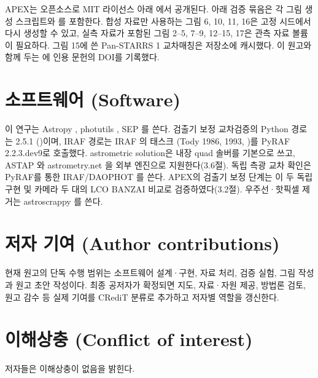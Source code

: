 APEX는 오픈소스로 MIT 라이선스 아래 \texttt{}에서 공개된다. \texttt{} 아래 검증 묶음은 각 그림 생성 스크립트와 \texttt{}를 포함한다. 합성 자료만 사용하는 그림 6, 10, 11, 16은 고정 시드에서 다시 생성할 수 있고, 실측 자료가 포함된 그림 2–5, 7–9, 12–15, 17은 관측 자료 볼륨이 필요하다. 그림 15에 쓴 Pan-STARRS 1 교차매칭은 저장소에 캐시했다. 이 원고와 함께 두는 \texttt{}에 인용 문헌의 DOI를 기록했다.



\section{소프트웨어 (Software)}

이 연구는 Astropy \citep{astropy2013, astropy2018, astropy2022}, photutils \citep{photutils}, SEP \citep{barbary2016} 를 쓴다. 검출기 보정 교차검증의 Python 경로는 \texttt{} 2.5.1 (\citet{ccdproc})이며, IRAF 경로는 IRAF \texttt{}의 \texttt{} 태스크 (Tody 1986, 1993, \citep{tody1986,tody1993})를 PyRAF 2.2.3.dev9로 호출했다. astrometric solution은 내장 quad 솔버를 기본으로 쓰고, ASTAP \citep{astap} 와 astrometry.net \citep{lang2010} 을 외부 엔진으로 지원한다(3.6절). 독립 측광 교차 확인은 PyRAF를 통한 IRAF/DAOPHOT \citep{stetson1987} 를 쓴다. APEX의 검출기 보정 단계는 이 두 독립 구현 및 카메라 두 대의 LCO BANZAI 비교로 검증하였다(3.2절). 우주선·핫픽셀 제거는 astroscrappy \citep{vandokkum2001} 를 쓴다.



\section{저자 기여 (Author contributions)}

현재 원고의 단독 수행 범위는 소프트웨어 설계·구현, 자료 처리, 검증 실험, 그림 작성과 원고 초안 작성이다. 최종 공저자가 확정되면 지도, 자료·자원 제공, 방법론 검토, 원고 감수 등 실제 기여를 CRediT 분류로 추가하고 저자별 역할을 갱신한다.



\section{이해상충 (Conflict of interest)}

저자들은 이해상충이 없음을 밝힌다.



